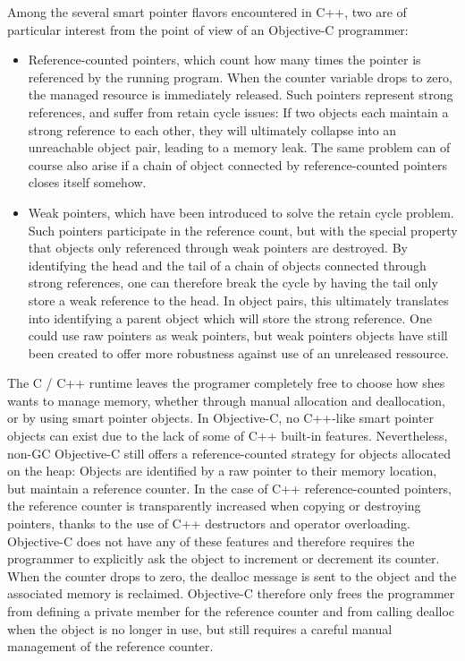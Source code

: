 Among the several smart pointer flavors encountered in C++, two are of particular interest from the point of view of an Objective-C programmer:
\begin{itemize}
\item Reference-counted pointers, which count how many times the pointer is referenced by the running program. When the counter variable drops to zero, the managed resource is immediately released. Such pointers represent strong references, and suffer from retain cycle issues: If two objects each maintain a strong reference to each other, they will ultimately collapse into an unreachable object pair, leading to a memory leak. The same problem can of course also arise if a chain of object connected by reference-counted pointers closes itself somehow.
\item Weak pointers, which have been introduced to solve the retain cycle problem. Such pointers participate in the reference count, but with the special property that objects only referenced through weak pointers are destroyed. By identifying the head and the tail of a chain of objects connected through strong references, one can therefore break the cycle by having the tail only store a weak reference to the head. In object pairs, this ultimately translates into identifying a parent object which will store the strong reference. One could use raw pointers as weak pointers, but weak pointers objects have still been created to offer more robustness against use of an unreleased ressource.
\end{itemize}

The C / C++ runtime leaves the programer completely free to choose how shes wants to manage memory, whether through manual allocation and deallocation, or by using smart pointer objects. In Objective-C, no C++-like smart pointer objects can exist due to the lack of some of C++ built-in features. Nevertheless, non-GC Objective-C still offers a reference-counted strategy for objects allocated on the heap: Objects are identified by a raw pointer to their memory location, but maintain a reference counter. In the case of C++ reference-counted pointers, the reference counter is transparently increased when copying or destroying pointers, thanks to the use of C++ destructors and operator overloading. Objective-C does not have any of these features and therefore requires the programmer to explicitly ask the object to increment or decrement its counter. When the counter drops to zero, the dealloc message is sent to the object and the associated memory is reclaimed. Objective-C therefore only frees the programmer from defining a private member for the reference counter and from calling dealloc when the object is no longer in use, but still requires a careful manual management of the reference counter.

